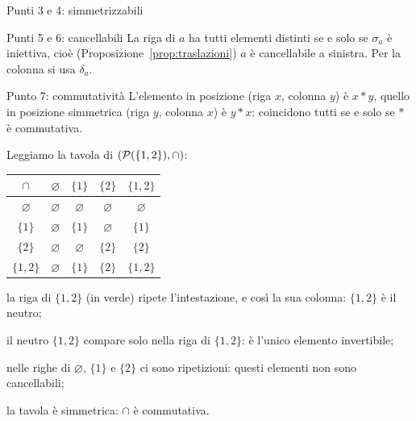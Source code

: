 \begin{concetto}
\begin{dimostrazione}
\begin{caso}{Punti 3 e 4: simmetrizzabili}
    \end{caso}
    \begin{caso}{Punti 5 e 6: cancellabili}
        La riga di $a$ ha tutti elementi distinti se e solo se $\sigma_a$ è iniettiva, cioè (Proposizione~\ref{prop:traslazioni}) $a$ è cancellabile
        a sinistra. Per la colonna si usa $\delta_a$.
    \end{caso}
    \begin{caso}{Punto 7: commutatività}
        L'elemento in posizione (riga $x$, colonna $y$) è $x * y$, quello in posizione simmetrica (riga $y$, colonna $x$) è $y * x$:
        coincidono tutti se e solo se $*$ è commutativa.
    \end{caso}
\end{dimostrazione}
\end{concetto}

\begin{spiegazione}
    Leggiamo la tavola di $(\mathcal{P}(\{1, 2\}), \cap)$:
    \begin{center}
    \renewcommand{\arraystretch}{1.25}
    \begin{tabular}{c|cccc}
        $\cap$ & $\varnothing$ & $\{1\}$ & $\{2\}$ & $\{1, 2\}$ \\ \hline
        $\varnothing$ & $\varnothing$ & $\varnothing$ & $\varnothing$ & $\varnothing$ \\
        $\{1\}$ & $\varnothing$ & $\{1\}$ & $\varnothing$ & $\{1\}$ \\
        $\{2\}$ & $\varnothing$ & $\varnothing$ & $\{2\}$ & $\{2\}$ \\
        \rowcolor{seagreen!15} $\{1, 2\}$ & $\varnothing$ & $\{1\}$ & $\{2\}$ & $\{1, 2\}$ \\
    \end{tabular}
    \end{center}
    \begin{passi}
        \item la riga di $\{1, 2\}$ (in verde) ripete l'intestazione, e così la sua colonna: $\{1, 2\}$ è il neutro;
        \item il neutro $\{1, 2\}$ compare solo nella riga di $\{1, 2\}$: è l'unico elemento invertibile;
        \item nelle righe di $\varnothing$, $\{1\}$ e $\{2\}$ ci sono ripetizioni: questi elementi non sono cancellabili;
        \item la tavola è simmetrica: $\cap$ è commutativa.
    \end{passi}
\end{spiegazione}


